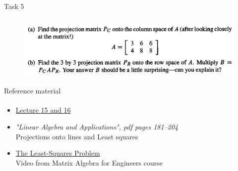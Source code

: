 \documentclass[aspectratio=169]{beamer}
\begin{document}
\begin{frame}[t]{Task 5}
    \framesubtitle{}
    \begin{figure}[H]
        \centering\includegraphics[height=3cm,width=1\textwidth,keepaspectratio]{5.png}
        \label{fig:5.png}
    \end{figure}
\end{frame}


\begin{frame}[t]{Reference material}
    \framesubtitle{}
    \Large
    \begin{itemize}
        \item \href{https://www.youtube.com/watch?v=Y_Ac6KiQ1t0&list=PL49CF3715CB9EF31D&index=15}{Lecture 15 and 16}
        \item \textit{"Linear Algebra and Applications", pdf pages 181--204 }\\ Projections onto lines and Least squares
        \item \href{https://www.coursera.org/lecture/matrix-algebra-engineers/the-least-squares-problem-I56Qy}{The Least-Squares Problem}\\ Video from Matrix Algebra for Engineers course
    \end{itemize}
\end{frame}
\end{document}
